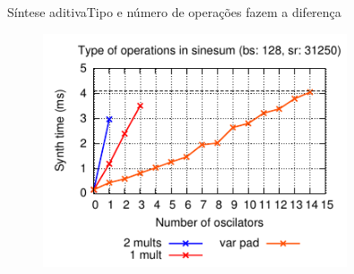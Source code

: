 \begin{frame}{Síntese aditiva}{Tipo e número de operações fazem a diferença}
\begin{figure}
\includegraphics[width=0.8\textwidth]{./img/operations-128-31250.pdf}
\end{figure}
\end{frame}

